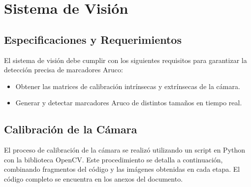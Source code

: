 \section{Sistema de Visión}
\subsection{Especificaciones y Requerimientos} 
El sistema de visión debe cumplir con los siguientes requisitos para garantizar la detección precisa de marcadores Aruco:
    \begin{itemize}
        \item Obtener las matrices de calibración intrínsecas y extrínsecas de la cámara.
        \item Generar y detectar marcadores Aruco de distintos tamaños en tiempo real.
    \end{itemize}

\subsection{Calibración de la Cámara} 
El proceso de calibración de la cámara se realizó utilizando un script en Python con la biblioteca OpenCV. Este procedimiento se detalla a continuación, combinando fragmentos del código y las imágenes obtenidas en cada etapa. El código completo se encuentra en los anexos del documento.
    
